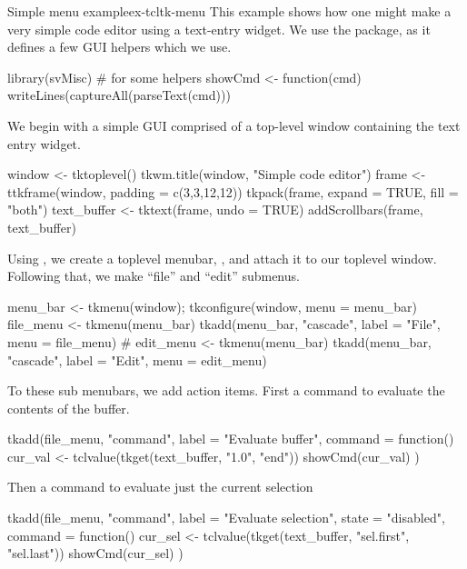 \begin{example}{Simple menu example}{ex-tcltk-menu}
This example shows how one might make a very simple code editor using
a text-entry widget. We use the
 package, as it defines a few GUI helpers which we use.
\begin{Schunk}
\begin{Sinput}
 library(svMisc)                         # for some helpers
 showCmd <- function(cmd) {
   writeLines(captureAll(parseText(cmd)))
 }
\end{Sinput}
\end{Schunk}

We begin with a simple GUI comprised of a top-level window containing
the text entry widget.
\begin{Schunk}
\begin{Sinput}
 window <- tktoplevel()
 tkwm.title(window, "Simple code editor")
 frame <- ttkframe(window, padding = c(3,3,12,12)) 
 tkpack(frame, expand = TRUE, fill = "both")
 text_buffer <- tktext(frame, undo = TRUE)
 addScrollbars(frame, text_buffer)
\end{Sinput}
\end{Schunk}
%

Using , we create a toplevel menubar, , and
attach it to our toplevel window. Following that, we make ``file'' and ``edit'' submenus.
\begin{Schunk}
\begin{Sinput}
 menu_bar <- tkmenu(window); tkconfigure(window, menu = menu_bar)
 file_menu <- tkmenu(menu_bar)
 tkadd(menu_bar, "cascade", label = "File", menu = file_menu)
 #
 edit_menu <- tkmenu(menu_bar)
 tkadd(menu_bar, "cascade", label = "Edit", menu = edit_menu)
\end{Sinput}
\end{Schunk}
%

To these sub menubars, we add action items. First a command to
evaluate the contents of the buffer.
\begin{Schunk}
\begin{Sinput}
 tkadd(file_menu, "command", label = "Evaluate buffer",
       command = function() {
         cur_val <- tclvalue(tkget(text_buffer, "1.0", "end"))
         showCmd(cur_val)
       })
\end{Sinput}
\end{Schunk}

Then a command to evaluate just the current selection
\begin{Schunk}
\begin{Sinput}
 tkadd(file_menu, "command", label = "Evaluate selection",
       state = "disabled",
       command =  function() {
         cur_sel <- tclvalue(tkget(text_buffer,
                                   "sel.first", "sel.last"))
         showCmd(cur_sel)
       })
\end{Sinput}
\end{Schunk}


\end{example}
